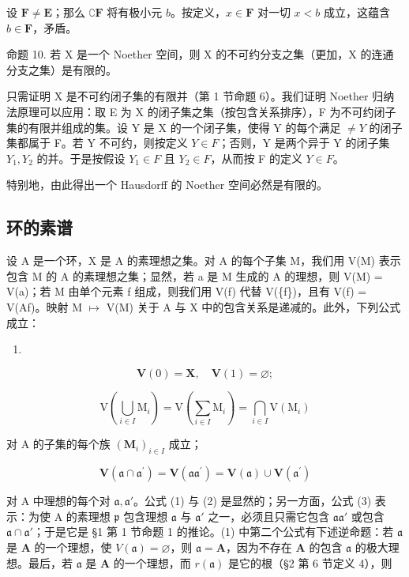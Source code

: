 设 \(\mathbf{F} \neq \mathbf{E}\)；那么 \(\complement\mathbf{F}\) 将有极小元 \(b\)。按定义，\(x \in \mathbf{F}\) 对一切 \(x < b\) 成立，这蕴含 \(b \in \mathbf{F}\)，矛盾。

命题 10. 若 X 是一个 Noether 空间，则 X 的不可约分支之集（更加，X 的连通分支之集）是有限的。

只需证明 X 是不可约闭子集的有限并（第 1 节命题 6）。我们证明 Noether 归纳法原理可以应用：取 E 为 X 的闭子集之集（按包含关系排序），F 为不可约闭子集的有限并组成的集。设 Y 是 X 的一个闭子集，使得 Y 的每个满足 \(\neq Y\) 的闭子集都属于 F。若 Y 不可约，则按定义 \(Y \in F\)；否则，Y 是两个异于 Y 的闭子集 \(Y_{1}, Y_{2}\) 的并。于是按假设 \(Y_{1} \in F\) 且 \(Y_{2} \in F\)，从而按 F 的定义 \(Y \in F\)。

特别地，由此得出一个 Hausdorff 的 Noether 空间必然是有限的。

\subsection{环的素谱}

设 A 是一个环，X 是 A 的素理想之集。对 A 的每个子集 M，我们用 V(M) 表示包含 M 的 A 的素理想之集；显然，若 a 是 M 生成的 A 的理想，则 V(M) = V(a)；若 M 由单个元素 f 组成，则我们用 V(f) 代替 V(\{f\})，且有 V(f) = V(Af)。映射 M \(\mapsto\) V(M) 关于 A 与 X 中的包含关系是递减的。此外，下列公式成立：

\begin{enumerate}
\def\labelenumi{(\arabic{enumi})}
\tightlist
\item
\end{enumerate}

\[
\mathbf {V} (0) = \mathbf {X}, \quad \mathbf {V} (1) = \varnothing ;\tag{1}
\]

\[
\mathrm{V} \left(\bigcup_ {i \in I} \mathrm{M} _ {i}\right) = \mathrm{V} \left(\sum_ {i \in I} \mathrm{M} _ {i}\right) = \bigcap_ {i \in I} \mathrm{V} (\mathrm{M} _ {i})\tag{2}
\]

对 A 的子集的每个族 \((\mathbf{M}_i)_{i\in I}\) 成立；

\[
\mathbf {V} (\mathfrak {a} \cap \mathfrak {a} ^ {\prime}) = \mathbf {V} (\mathfrak {a a} ^ {\prime}) = \mathbf {V} (\mathfrak {a}) \cup \mathbf {V} (\mathfrak {a} ^ {\prime})\tag{3}
\]

对 A 中理想的每个对 \(\mathfrak{a},\mathfrak{a}'\)。公式 (1) 与 (2) 是显然的；另一方面，公式 (3) 表示：为使 A 的素理想 \(\mathfrak{p}\) 包含理想 \(\mathfrak{a}\) 与 \(\mathfrak{a}'\) 之一，必须且只需它包含 \(\mathfrak{a}\mathfrak{a}'\) 或包含 \(\mathfrak{a} \cap \mathfrak{a}'\)；于是它是 §1 第 1 节命题 1 的推论。(1) 中第二个公式有下述逆命题：若 \(\mathfrak{a}\) 是 \(\mathbf{A}\) 的一个理想，使 \(V(\mathfrak{a}) = \varnothing\)，则 \(\mathfrak{a} = \mathbf{A}\)，因为不存在 \(\mathbf{A}\) 的包含 \(\mathfrak{a}\) 的极大理想。最后，若 \(\mathfrak{a}\) 是 \(\mathbf{A}\) 的一个理想，而 \(r(\mathfrak{a})\) 是它的根（§2 第 6 节定义 4），则

